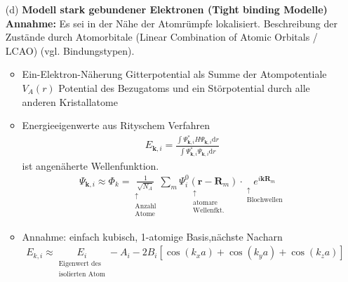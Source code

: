 \begin{itemize}
\begin{itemize}
        \end{itemize}
    \item[(d)] \textbf{Modell stark gebundener Elektronen (Tight binding Modelle)} \\
    \textbf{Annahme:} Es sei in der Nähe der Atomrümpfe lokalisiert. Beschreibung der Zustände durch Atomorbitale (Linear Combination of Atomic Orbitals / LCAO) (vgl. Bindungstypen).\\
    \begin{itemize}
        \item Ein-Elektron-Näherung Gitterpotential als Summe der Atompotentiale $V_A(r)$ Potential des Bezugatoms und ein Störpotential durch alle anderen Kristallatome
        \item Energieeigenwerte aus Rityschem Verfahren \begin{align*}
            E_{\textbf{k},i} = \frac{\int \Psi_{\textbf{k},i}^* H \Psi_{\textbf{k},i} \mathrm{d}r}{\int \Psi_{\textbf{k},i}^* \Psi_{\textbf{k},i} \mathrm{d}r}
        \end{align*}
        ist angenäherte Wellenfunktion.
        \begin{align*}
            \Psi_{\textbf{k},i}\approx \Phi_k = \underset{\begin{matrix}
                \uparrow\\
                \text{Anzahl}\\
                \text{Atome}
            \end{matrix}}{\frac{1}{\sqrt{N_A}}}\sum_m \underset{\begin{matrix}
                \uparrow\\
                \text{atomare}\\
                \text{Wellenfkt.}
            \end{matrix}}{\Psi^0_i(\textbf{r}-\textbf{R}_m)}\cdot \underset{\begin{matrix}
                \uparrow\\
                \text{Blochwellen}
            \end{matrix}}{e^{i \textbf{k} \textbf{R}_m}}
        \end{align*}
        \item Annahme: einfach kubisch, 1-atomige Basis,nächste Nacharn 
        \begin{align*}
            E_{k,i} \approx  \underset{\begin{matrix}
                \text{Eigenwert des}\\
                \text{isolierten Atom}           \end{matrix}}{E_i} - A_i - 2B_i[\cos(k_x a)+ \cos(k_y a) + \cos(k_z a)]

\end{align*}
\end{itemize}
\end{itemize}

